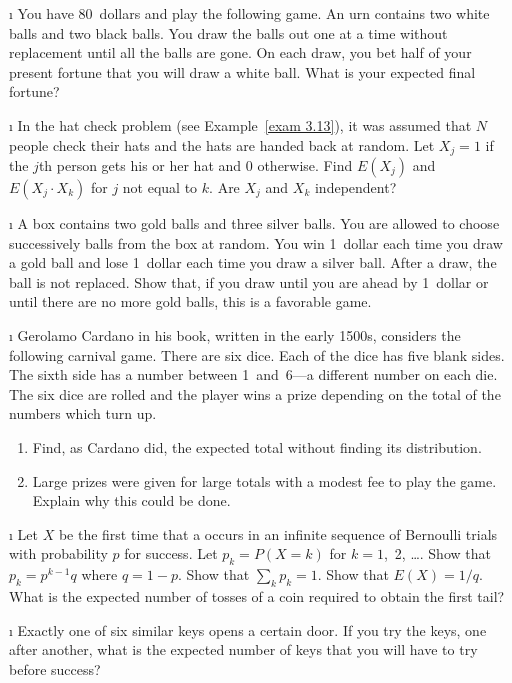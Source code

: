 \begin{LJSItem}
\i\label{exer 6.1.13} You have 80~dollars and play the following game.  An urn
contains two white balls and two black balls.  You draw the balls out one at a time
without replacement until all the balls are gone.  On each draw, you bet half of your
present fortune that you will draw a white ball.  What is your expected final fortune?

\i\label{exer 6.1.14} In the hat check problem (see Example~\ref{exam 3.13}), it
was assumed that $N$ people check their hats and the hats are handed
back at random.  Let $X_j = 1$ if the $j$th person gets his or her hat and 0
otherwise.  Find $E(X_j)$ and $E(X_j \cdot X_k)$ for $j$ not equal to $k$.  Are $X_j$
and $X_k$ independent?

\i\label{exer 6.1.16} A box contains two gold balls and three silver balls.  You
are allowed to choose successively balls from the box at random.  You win 1~dollar
each time you draw a gold ball and lose 1~dollar each time you draw a silver ball. 
After a draw, the ball is not replaced.  Show that, if you draw until you are ahead
by 1~dollar or until there are no more gold balls, this is a favorable game.

\i\label{exer 6.1.17} Gerolamo Cardano in his book, 
written in the early 1500s, considers the following carnival game.  There are six
dice.  Each of the dice has five blank sides.  The sixth side has a number between
1~and~6---a different number on each die.  The six dice are rolled and the player
wins a prize depending on the total of the numbers which turn up.

\begin{enumerate}
\item Find, as Cardano did, the expected total without finding its distribution.

\item Large prizes were given for large totals with a modest fee to play the game. 
Explain why this could be done.
\end{enumerate}

\i\label{exer 6.1.18} Let $X$ be the first time that a  occurs in
an infinite sequence of Bernoulli trials with probability $p$ for success.  Let $p_k
= P(X = k)$ for $k = 1$,~2, \dots.  Show that $p_k = p^{k - 1}q$ where $q = 1 - p$. 
Show that $\sum_k p_k = 1$.  Show that $E(X) = 1/q$.  What is the expected number of
tosses of a coin required to obtain the first tail?

\i\label{exer 6.1.19} Exactly one of six similar keys opens a certain door.  If
you try the keys, one after another, what is the expected number of keys that you
will have to try before success?


\end{LJSItem}
